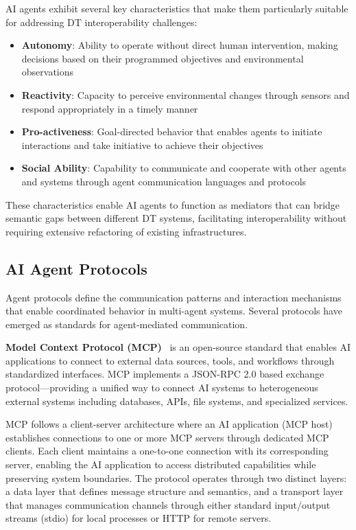 AI agents exhibit several key characteristics that make them particularly suitable for addressing DT interoperability challenges:
\begin{itemize}
    \item \textbf{Autonomy}:
    Ability to operate without direct human intervention,
        making decisions based on their programmed objectives and environmental observations
    \item \textbf{Reactivity}:
    Capacity to perceive environmental changes through
        sensors and respond appropriately in a timely manner
    \item \textbf{Pro-activeness}:
    Goal-directed behavior that enables agents to initiate interactions and
        take initiative to achieve their objectives
    \item \textbf{Social Ability}:
    Capability to communicate and cooperate with other agents and systems
        through agent communication languages and protocols
\end{itemize}

These characteristics enable AI agents to function as
    mediators that can bridge semantic gaps between different DT systems,
    facilitating interoperability without requiring extensive refactoring of existing infrastructures.

\subsection{AI Agent Protocols}

Agent protocols define the communication patterns and interaction mechanisms that enable coordinated behavior in multi-agent systems.
Several protocols have emerged as standards for agent-mediated communication.

\textbf{Model Context Protocol (MCP)}~\cite{Anthropic_2024}
    is an open-source standard that enables AI applications to
    connect to external data sources, tools, and workflows through
    standardized interfaces.
MCP implements a JSON-RPC 2.0 based exchange protocol—providing a unified way to
    connect AI systems to heterogeneous external systems including 
    databases, APIs, file systems, and specialized services.

MCP follows a client-server architecture where
    an AI application (MCP host) establishes connections to one or more MCP servers through dedicated MCP clients.
Each client maintains a one-to-one connection with its corresponding server, enabling the AI application to
    access distributed capabilities while preserving system boundaries.
The protocol operates through two distinct layers:
    a data layer that defines message structure and semantics, and
    a transport layer that manages communication channels through either standard input/output streams (stdio) for local processes or HTTP for remote servers.

